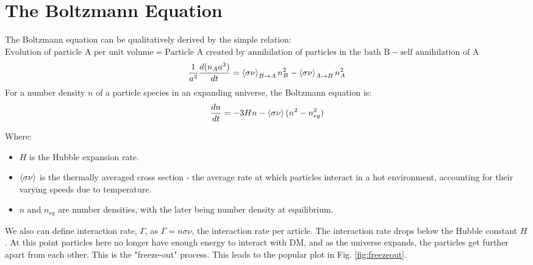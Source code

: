 \documentclass[12pt]{article}
\begin{document}
\section{The Boltzmann Equation}
\label{sec:boltzmann}
The Boltzmann equation can be qualitatively derived by the simple relation:
$\text{Evolution of particle A per unit volume} = \text{Particle A created by annihilation of particles in the bath B} - \text{self annihilation of A}$
\begin{equation}
    \begin{split}
        \frac{1}{a^3}\frac{d(n_Aa^3)}{dt} = \braket{\sigma \nu}_{B \rightarrow A} n^2_B- \braket{\sigma \nu}_{A \rightarrow B}n^2_A
    \end{split}
\end{equation}
For a number density $n$ of a particle species in an expanding universe, the Boltzmann equation is:
\begin{equation}
    \label{eqn:boltzmann}
    \frac{dn}{dt} = -3Hn - \braket{\sigma\nu}(n^2 - n^2_{eq})
\end{equation}

Where:
\begin{itemize}
    \item $H$ is the Hubble expansion rate.
    \item $\braket{\sigma\nu}$ is the thermally averaged cross section - the average rate at which particles interact in a hot environment, accounting for their varying speeds due to temperature.
    \item $n$ and $n_{eq}$ are number densities, with the later being number density at equilibrium.
\end{itemize}

We also can define interaction rate, $\Gamma$, as $\Gamma = n\sigma\nu$, the interaction rate per article. The interaction rate drops below the Hubble constant $H$. At this point particles here no longer have enough energy to interact with DM, and as the universe expands, the particles get further apart from each other. This is the "freeze-out" process. This leads to the popular plot in Fig. \ref{fig:freezeout}.
\end{document}
